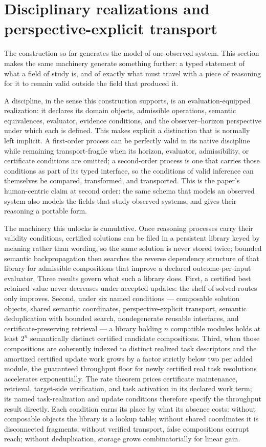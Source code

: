 \documentclass[11pt]{article}
\theoremstyle{definition}
\begin{document}
\section{Disciplinary realizations and perspective-explicit transport}

The construction so far generates the model of one observed system. This section makes the same machinery generate something further: a typed statement of what a field of study is, and of exactly what must travel with a piece of reasoning for it to remain valid outside the field that produced it.

A discipline, in the sense this construction supports, is an evaluation-equipped realization: it declares its domain objects, admissible operations, semantic equivalences, evaluator, evidence conditions, and the observer--horizon perspective under which each is defined. This makes explicit a distinction that is normally left implicit. A first-order process can be perfectly valid in its native discipline while remaining transport-fragile when its horizon, evaluator, admissibility, or certificate conditions are omitted; a second-order process is one that carries those conditions as part of its typed interface, so the conditions of valid inference can themselves be compared, transformed, and transported. This is the paper's human-centric claim at second order: the same schema that models an observed system also models the fields that study observed systems, and gives their reasoning a portable form.

The machinery this unlocks is cumulative. Once reasoning processes carry their validity conditions, certified solutions can be filed in a persistent library keyed by meaning rather than wording, so the same solution is never stored twice; bounded semantic backpropagation then searches the reverse dependency structure of that library for admissible compositions that improve a declared outcome-per-input evaluator. Three results govern what such a library does. First, a certified best retained value never decreases under accepted updates: the shelf of solved routes only improves. Second, under six named conditions --- composable solution objects, shared semantic coordinates, perspective-explicit transport, semantic deduplication with bounded search, nondegenerate reusable interfaces, and certificate-preserving retrieval --- a library holding $n$ compatible modules holds at least $2^n$ semantically distinct certified candidate compositions. Third, when those compositions are coherently indexed to distinct realized task descriptors and the amortized certified update work grows by a factor strictly below two per added module, the guaranteed throughput floor for newly certified real task resolutions accelerates exponentially. The rate theorem prices certificate maintenance, retrieval, target-side verification, and task activation in its declared work term; its named task-realization and update conditions therefore specify the throughput result directly. Each condition earns its place by what its absence costs: without composable objects the library is a lookup table; without shared coordinates it is disconnected fragments; without verified transport, false compositions corrupt reach; without deduplication, storage grows combinatorially for linear gain.
\end{document}
